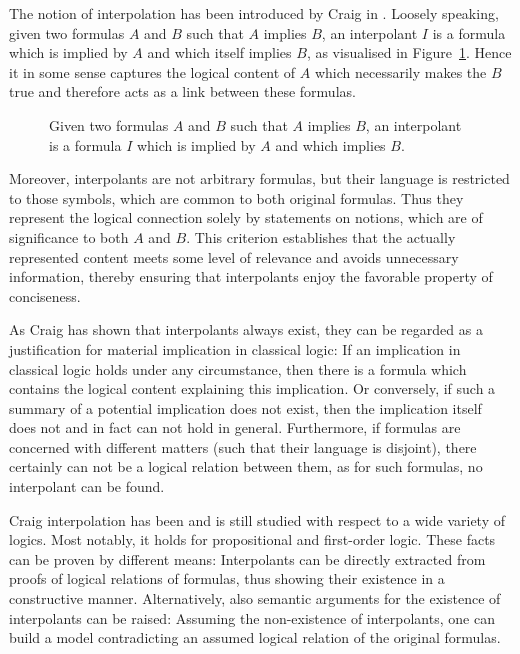 

The notion of interpolation has been introduced by Craig in \cite{Craig57linear}.
Loosely speaking, given two formulas $A$ and $B$ such that $A$ implies $B$, an interpolant $I$ is a formula which is implied by $A$ and which itself implies $B$, as visualised in Figure~\ref{fig:interpol}.
Hence it in some sense captures the logical content of $A$ which necessarily makes the $B$ true and therefore acts as a link between these formulas.

\begin{figure}[htbp]
	\centering
	\label{fig:interpol}
	\caption{Given two formulas $A$ and $B$ such that $A$ implies $B$, an interpolant is a formula $I$ which is implied by $A$ and which implies $B$.}
\end{figure}
Moreover, interpolants are not arbitrary formulas, but their language is restricted to those symbols, which are common to both original formulas.
Thus they represent the logical connection solely by statements on notions, which are of significance to both $A$ and $B$.
This criterion establishes that the actually represented content meets some level of relevance and avoids unnecessary information, thereby ensuring that interpolants enjoy the favorable property of conciseness.

As Craig has shown that interpolants always exist, they can be regarded as a justification for material implication in classical logic:
If an implication in classical logic holds under any circumstance, then there is a formula which contains the logical content explaining this implication.
Or conversely, if such a summary of a potential implication does not exist, then the implication itself does not and in fact can not hold in general.
Furthermore, if formulas are concerned with different matters (such that their language is disjoint), there certainly can not be a logical relation between them, as for such formulas, no interpolant can be found.

Craig interpolation has been and is still studied with respect to a wide variety of logics.
Most notably, it holds for propositional and first-order logic.
These facts can be proven by different means:
Interpolants can be directly extracted from proofs of logical relations of formulas, thus showing their existence in a constructive manner.
Alternatively, also semantic arguments for the existence of interpolants can be raised:
Assuming the non-existence of interpolants, one can build a model contradicting an assumed logical relation of the original formulas.

